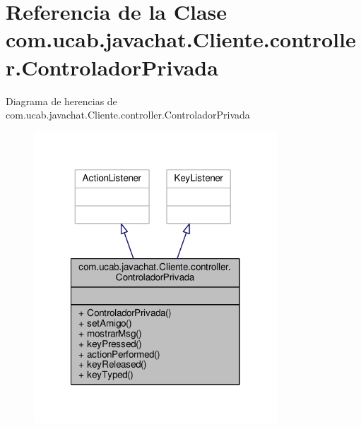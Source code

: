 \hypertarget{classcom_1_1ucab_1_1javachat_1_1_cliente_1_1controller_1_1_controlador_privada}{\section{Referencia de la Clase com.\-ucab.\-javachat.\-Cliente.\-controller.\-Controlador\-Privada}
\label{classcom_1_1ucab_1_1javachat_1_1_cliente_1_1controller_1_1_controlador_privada}
}


Diagrama de herencias de com.\-ucab.\-javachat.\-Cliente.\-controller.\-Controlador\-Privada
\nopagebreak
\begin{figure}[H]
\begin{center}
\leavevmode
\includegraphics[width=258pt]{dd/d0c/classcom_1_1ucab_1_1javachat_1_1_cliente_1_1controller_1_1_controlador_privada__inherit__graph}
\end{center}
\end{figure}


